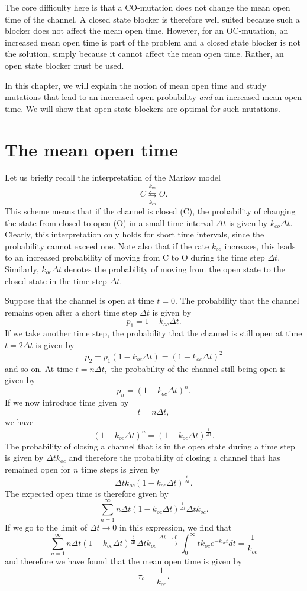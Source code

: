The core difficulty here is that a CO-mutation does not
change the mean open time of the channel. A closed state blocker is therefore
well suited because such a blocker does not affect the mean open time. 
However, for an OC-mutation,
an increased mean open time is part of the problem and a closed state blocker
is not the solution, simply because it cannot affect the mean open time. Rather, an open state blocker must be used.

In this chapter, we will explain the notion of mean open time and study
mutations that lead to an increased open probability \textit{and} an increased mean
open time. We will show that open state blockers are optimal for such mutations.

\section{The mean open time}

Let us briefly recall the interpretation of the Markov model
\[
C\underset{k_{co}}{\overset{k_{oc}}{\leftrightarrows}}O.
\]
This scheme means that if the channel is closed (C), the probability of
changing the state from closed to open (O) in a small time interval $\Delta t$ is
given by $k_{co}\Delta t.$ Clearly, this interpretation only holds for short
time intervals, since the probability cannot exceed one. Note also that if the
rate $k_{co}$ increases, this leads to an increased probability of moving from C
to O during the time step $\Delta t.$ Similarly, $k_{oc}\Delta t$ denotes the
probability of moving from the open state to the closed state in the time step
$\Delta t.$

Suppose that the channel is open at time $t=0.$ The probability that the
channel remains open after a short time step $\Delta t$ is given by%
\[
p_{1}=1-k_{oc}\Delta t.
\]
If we take another time step, the probability that the channel is still open
at time $t=2\Delta t$ is given by%
\[
p_{2}=p_{1}\left(  1-k_{oc}\Delta t\right)  =\left(  1-k_{oc}\Delta t\right)
^{2}%
\]
and so on. At time $t=n\Delta t,$ the probability of the channel still being
open is given by%
\[
p_{n}=\left(  1-k_{oc}\Delta t\right)  ^{n}.
\]
If we now introduce time given by%
\[
t=n\Delta t,
\]
we have%
\[
\left(  1-k_{oc}\Delta t\right)  ^{n}=\left(  1-k_{oc}\Delta t\right)
^{\frac{t}{\Delta t}}.%
\]
The probability of closing a channel that is in the open state during a
time step is given by $\Delta tk_{oc}$ and therefore the probability of
closing a channel that has remained open for $n$ time steps is given by%
\[
\Delta tk_{oc}\left(  1-k_{oc}\Delta t\right)  ^{\frac{t}{\Delta t}}.
\]
The expected open time is therefore given by%
\[
\sum_{n=1}^{\infty}n\Delta t\left(  1-k_{oc}\Delta t\right)  ^{\frac{t}{\Delta
t}}\Delta tk_{oc}.
\]
If we go to the limit of $\Delta t\rightarrow0$ in this expression, we find
that%
\[
\sum_{n=1}^{\infty}n\Delta t\left(  1-k_{oc}\Delta t\right)  ^{\frac{t}{\Delta
t}}\Delta tk_{oc}\overset{\Delta t\rightarrow0}{\longrightarrow}\int%
_{0}^{\infty}tk_{oc}e^{-k_{oc}t}dt=\frac{1}{k_{oc}}%
\]
and therefore we have found that the mean open time is given by%
\begin{equation}
\tau_{o}=\frac{1}{k_{oc}}. \label{tau_o}%
\end{equation}



